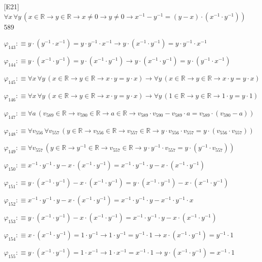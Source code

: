 \begin{fullproof}{[E21]}{$\forall x\,\forall y\,(x \in \mathbb{R} \to y \in \mathbb{R} \to x \neq 0 \to y \neq 0 \to x^{-1} - y^{-1} = (y - x) \cdot (x^{-1} \cdot y^{-1}))$}{589}
\begin{abbrevlist}
\item $\varphi_{143} :\equiv y \cdot (y^{-1} \cdot x^{-1}) = y \cdot y^{-1} \cdot x^{-1} \to y \cdot (x^{-1} \cdot y^{-1}) = y \cdot y^{-1} \cdot x^{-1}$
\item $\varphi_{144} :\equiv y \cdot (x^{-1} \cdot y^{-1}) = y \cdot (x^{-1} \cdot y^{-1}) \to y \cdot (x^{-1} \cdot y^{-1}) = y \cdot (y^{-1} \cdot x^{-1})$
\item $\varphi_{145} :\equiv \forall x\,\forall y\,(x \in \mathbb{R} \to y \in \mathbb{R} \to x \cdot y = y \cdot x) \to \forall y\,(x \in \mathbb{R} \to y \in \mathbb{R} \to x \cdot y = y \cdot x)$
\item $\varphi_{146} :\equiv \forall x\,\forall y\,(x \in \mathbb{R} \to y \in \mathbb{R} \to x \cdot y = y \cdot x) \to \forall y\,(1 \in \mathbb{R} \to y \in \mathbb{R} \to 1 \cdot y = y \cdot 1)$
\item $\varphi_{147} :\equiv \forall a\,(v_{589} \in \mathbb{R} \to v_{590} \in \mathbb{R} \to a \in \mathbb{R} \to v_{589} \cdot v_{590} - v_{589} \cdot a = v_{589} \cdot (v_{590} - a))$
\item $\varphi_{148} :\equiv \forall v_{556}\,\forall v_{557}\,(y \in \mathbb{R} \to v_{556} \in \mathbb{R} \to v_{557} \in \mathbb{R} \to y \cdot v_{556} \cdot v_{557} = y \cdot (v_{556} \cdot v_{557}))$
\item $\varphi_{149} :\equiv \forall v_{557}\,(y \in \mathbb{R} \to y^{-1} \in \mathbb{R} \to v_{557} \in \mathbb{R} \to y \cdot y^{-1} \cdot v_{557} = y \cdot (y^{-1} \cdot v_{557}))$
\item $\varphi_{150} :\equiv x^{-1} \cdot y^{-1} \cdot y - x \cdot (x^{-1} \cdot y^{-1}) = x^{-1} \cdot y^{-1} \cdot y - x \cdot (x^{-1} \cdot y^{-1})$
\item $\varphi_{151} :\equiv y \cdot (x^{-1} \cdot y^{-1}) - x \cdot (x^{-1} \cdot y^{-1}) = y \cdot (x^{-1} \cdot y^{-1}) - x \cdot (x^{-1} \cdot y^{-1})$
\item $\varphi_{152} :\equiv x^{-1} \cdot y^{-1} \cdot y - x \cdot (x^{-1} \cdot y^{-1}) = x^{-1} \cdot y^{-1} \cdot y - x^{-1} \cdot y^{-1} \cdot x$
\item $\varphi_{153} :\equiv y \cdot (x^{-1} \cdot y^{-1}) - x \cdot (x^{-1} \cdot y^{-1}) = x^{-1} \cdot y^{-1} \cdot y - x \cdot (x^{-1} \cdot y^{-1})$
\item $\varphi_{154} :\equiv x \cdot (x^{-1} \cdot y^{-1}) = 1 \cdot y^{-1} \to 1 \cdot y^{-1} = y^{-1} \cdot 1 \to x \cdot (x^{-1} \cdot y^{-1}) = y^{-1} \cdot 1$
\item $\varphi_{155} :\equiv y \cdot (x^{-1} \cdot y^{-1}) = 1 \cdot x^{-1} \to 1 \cdot x^{-1} = x^{-1} \cdot 1 \to y \cdot (x^{-1} \cdot y^{-1}) = x^{-1} \cdot 1$

\end{abbrevlist}
\end{fullproof}
